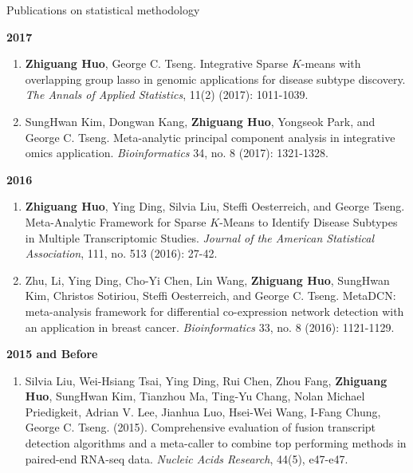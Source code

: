 \documentclass{resume} %
\begin{document}
\begin{rSection}{Publications on statistical methodology}
\begin{enumerate}[noitemsep,topsep=0pt, resume]
\label{mlmethod_5}

\end{enumerate}

\textbf{2017}
\begin{enumerate}[noitemsep,topsep=0pt, resume]

\item {\bf Zhiguang Huo}, George C. Tseng. 
    Integrative Sparse $K$-means with overlapping group lasso in genomic applications for disease subtype discovery.
    \emph{The Annals of Applied Statistics}, 11(2) (2017): 1011-1039.

\label{genstat_7} 
\label{mlmethod_4}
\label{soft_3} 

\item 
SungHwan Kim, Dongwan Kang, {\bf Zhiguang Huo}, Yongseok Park, and George C. Tseng. 
Meta-analytic principal component analysis in integrative omics application. 
\emph{Bioinformatics} 34, no. 8 (2017): 1321-1328.
\label{genstat_6} 
\label{mlmethod_3}

\end{enumerate}

\textbf{2016}
\begin{enumerate}[noitemsep,topsep=0pt,resume]

 \item  {\bf Zhiguang Huo}, Ying Ding, Silvia Liu, Steffi Oesterreich, and George Tseng. Meta-Analytic Framework for Sparse $K$-Means to Identify Disease Subtypes in Multiple Transcriptomic Studies. \emph{Journal of the American Statistical Association},  111, no. 513 (2016): 27-42.

\label{genstat_5} 
\label{mlmethod_2}
\label{soft_2} 

\item 
Zhu, Li, Ying Ding, Cho-Yi Chen, Lin Wang,  {\bf Zhiguang Huo}, SungHwan Kim, Christos Sotiriou, Steffi Oesterreich, and George C. Tseng. MetaDCN: meta-analysis framework for differential co-expression network detection with an application in breast cancer. \emph{Bioinformatics} 33, no. 8 (2016): 1121-1129.
\label{genstat_4} 

\end{enumerate}


\textbf{2015 and Before}
\begin{enumerate}[noitemsep,topsep=0pt,resume]
    \item Silvia Liu, Wei-Hsiang Tsai, Ying Ding, Rui Chen, Zhou Fang, {\bf Zhiguang Huo}, SungHwan Kim, Tianzhou Ma, Ting-Yu Chang, Nolan Michael Priedigkeit, Adrian V. Lee, Jianhua Luo, Hsei-Wei Wang, I-Fang Chung, George C. Tseng. (2015).
Comprehensive evaluation of fusion transcript detection algorithms and a meta-caller to combine top performing methods in paired-end RNA-seq data.
\emph{Nucleic Acids Research}, 44(5), e47-e47. 


\end{enumerate}
\end{rSection}
\end{document}

